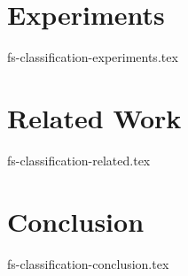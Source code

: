 \documentclass[sigconf]{acmart}
\theoremstyle{remark}
\begin{document}
\section {Experiments}
 {fs-classification-experiments.tex}

\section{Related Work}
 {fs-classification-related.tex}

\section {Conclusion}
 {fs-classification-conclusion.tex}



\end{document}
